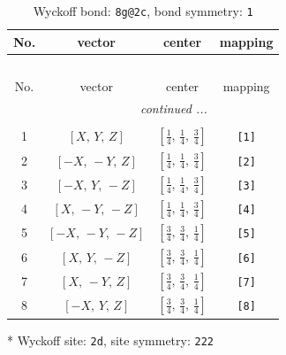 \documentclass[fleqn,8pt]{jsarticle}
\begin{document}
\renewcommand{\arraystretch}{1.2}
\begin{longtable}{cccc}
\caption{Wyckoff bond: {\tt 8g@2c}, bond symmetry: {\tt 1}}
 \\
 \hline \hline
No. & vector & center & mapping \\ \hline \endfirsthead

\multicolumn{3}{l}{\tablename\ \thetable{}} \\
 \hline \hline
No. & vector & center & mapping \\ \hline \endhead

 \hline \hline
\multicolumn{3}{r}{\footnotesize\it continued ...} \\ \endfoot

 \hline \hline
\multicolumn{3}{r}{} \\ \endlastfoot

1 & $\left[ X,\, Y,\, Z \right]$ & $\left[ \frac{1}{4},\, \frac{1}{4},\, \frac{3}{4} \right]$ & {\tt [1]} \\ \hline
2 & $\left[ - X,\, - Y,\, Z \right]$ & $\left[ \frac{1}{4},\, \frac{1}{4},\, \frac{3}{4} \right]$ & {\tt [2]} \\ \hline
3 & $\left[ - X,\, Y,\, - Z \right]$ & $\left[ \frac{1}{4},\, \frac{1}{4},\, \frac{3}{4} \right]$ & {\tt [3]} \\ \hline
4 & $\left[ X,\, - Y,\, - Z \right]$ & $\left[ \frac{1}{4},\, \frac{1}{4},\, \frac{3}{4} \right]$ & {\tt [4]} \\ \hline
5 & $\left[ - X,\, - Y,\, - Z \right]$ & $\left[ \frac{3}{4},\, \frac{3}{4},\, \frac{1}{4} \right]$ & {\tt [5]} \\ \hline
6 & $\left[ X,\, Y,\, - Z \right]$ & $\left[ \frac{3}{4},\, \frac{3}{4},\, \frac{1}{4} \right]$ & {\tt [6]} \\ \hline
7 & $\left[ X,\, - Y,\, Z \right]$ & $\left[ \frac{3}{4},\, \frac{3}{4},\, \frac{1}{4} \right]$ & {\tt [7]} \\ \hline
8 & $\left[ - X,\, Y,\, Z \right]$ & $\left[ \frac{3}{4},\, \frac{3}{4},\, \frac{1}{4} \right]$ & {\tt [8]} \\
\end{longtable}
* Wyckoff site: {\tt 2d}, site symmetry: {\tt 222}
\renewcommand{\arraystretch}{1.2}
\end{document}
